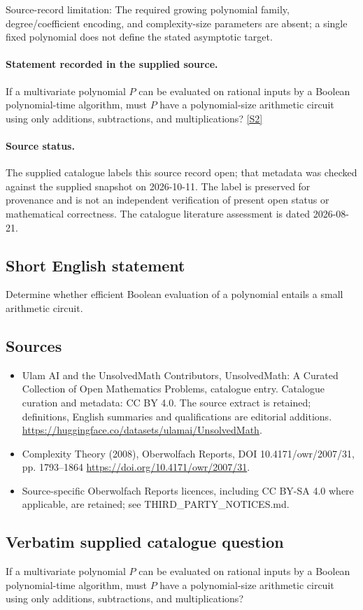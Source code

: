 \documentclass[11pt]{article}
\begin{document}
Source-record limitation: The required growing polynomial family, degree/coefficient encoding, and complexity-size parameters are absent; a single fixed polynomial does not define the stated asymptotic target.
\paragraph{Statement recorded in the supplied source.}
If a multivariate polynomial $P$ can be evaluated on rational inputs by a Boolean polynomial-time algorithm, must $P$ have a polynomial-size arithmetic circuit using only additions, subtractions, and multiplications? \href{https://doi.org/10.4171/owr/2007/31}{[S2]}
\paragraph{Source status.}
The supplied catalogue labels this source record open; that metadata was checked against the supplied snapshot on 2026-10-11. The label is preserved for provenance and is not an independent verification of present open status or mathematical correctness. The catalogue literature assessment is dated 2026-08-21.
\subsection{Short English statement}
Determine whether efficient Boolean evaluation of a polynomial entails a small arithmetic circuit.
\subsection{Sources}
\begin{itemize}
\item[S1] Ulam AI and the UnsolvedMath Contributors, UnsolvedMath: A Curated Collection of Open Mathematics Problems, catalogue entry. Catalogue curation and metadata: CC BY 4.0. The source extract is retained; definitions, English summaries and qualifications are editorial additions.
\url{https://huggingface.co/datasets/ulamai/UnsolvedMath}.
\item[S2] Complexity Theory (2008), Oberwolfach Reports, DOI 10.4171/owr/2007/31, pp. 1793--1864
\url{https://doi.org/10.4171/owr/2007/31}.
\item Source-specific Oberwolfach Reports licences, including CC BY-SA 4.0 where applicable, are retained; see THIRD\_PARTY\_NOTICES.md.
\end{itemize}
\subsection{Verbatim supplied catalogue question}
If a multivariate polynomial $P$ can be evaluated on rational inputs by a Boolean polynomial-time algorithm, must $P$ have a polynomial-size arithmetic circuit using only additions, subtractions, and multiplications?
\end{document}
